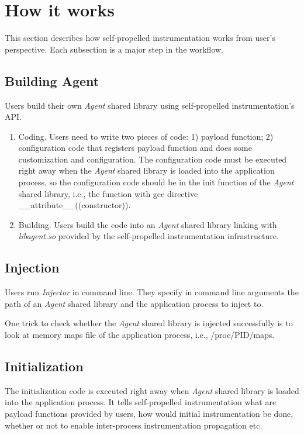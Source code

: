 \section{How it works}
This section describes how self-propelled instrumentation works from user's
perspective. Each subsection is a major step in the workflow.

\subsection{Building Agent}
Users build their own {\em Agent} shared library using self-propelled
instrumentation's API.
\begin{enumerate}
\item Coding. Users need to write two pieces of code: 1) payload function; 2)
  configuration code that registers payload function and does some customization
  and configuration. The configuration code must be executed right away when the
  {\em Agent} shared library is loaded into the application process, so the
  configuration code should be in the init function of the {\em Agent} shared
  library, i.e., the function with gcc directive
  \_\_attribute\_\_((constructor)).
\item Building. Users build the code into an {\em Agent} shared library linking
  with {\em libagent.so} provided by the self-propelled instrumentation
  infrastructure.
\end{enumerate}

\subsection{Injection}
Users run {\em Injector} in command line. They specify in command line arguments
the path of an {\em Agent} shared library and the application process to inject
to.

One trick to check whether the {\em Agent} shared library is injected
successfully is to look at memory maps file of the application process, i.e.,
/proc/PID/maps.

\subsection{Initialization} %

The initialization code is executed right away when {\em Agent} shared library
is loaded into the application process.
It tells self-propelled instrumentation what are payload functions provided by
users, how would initial instrumentation be done, whether or not to enable
inter-process instrumentation propagation etc.

